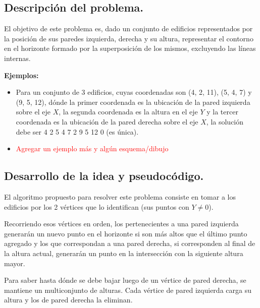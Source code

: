 \subsection{Descripción del problema.}

\vspace*{0.3cm}

El objetivo de este problema es, dado un conjunto de edificios representados
por la posición de sus paredes izquierda, derecha y su altura, representar el
contorno en el horizonte formado por la superposición de los mismos, excluyendo
las líneas internas.

\vspace*{0.5cm}

\textbf{Ejemplos:}
\begin{itemize}
  \item Para un conjunto de 3 edificios, cuyas coordenadas son (4, 2, 11),
  (5, 4, 7) y (9, 5, 12), dónde la primer coordenada es la ubicación de la pared
  izquierda sobre el eje $X$, la segunda coordenada es la altura en el eje $Y$ y la
  tercer coordenada es la ubicación de la pared derecha sobre el eje $X$, la
  solución debe ser 4 2 5 4 7 2 9 5 12 0 (es única).

  \item \textcolor{red}{Agregar un ejemplo más y algún esquema/dibujo}
\end{itemize}



\subsection{Desarrollo de la idea y pseudocódigo.}

\vspace*{0.3cm}

El algoritmo propuesto para resolver este problema consiste en tomar a los edificios
por los 2 vértices que lo identifican (sus puntos con $Y \neq 0$).

Recorriendo esos vértices en orden, los pertenecientes a una pared izquierda
generarán un nuevo punto en el horizonte si son más altos que el último punto agregado
y los que correspondan a una pared derecha, si corresponden al final de la
altura actual, generarán un punto en la intersección con la siguiente altura mayor.

Para saber hasta dónde se debe bajar luego de un vértice de pared derecha, se
mantiene un multiconjunto de alturas. Cada vértice de pared izquierda carga su
altura y los de pared derecha la eliminan.

